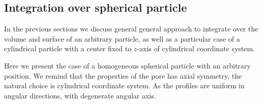 \documentclass[10pt, a4paper]{article}
\begin{document}
\subsection*{Integration over spherical particle}
\begin{multicols}{2}

In the previous sections we discuss general general approach to integrate over the volume and surface of an arbitrary particle, as well as a particular case of a cylindrical particle with a center fixed to $z$-axis of cylindrical coordinate system.

Here we present the case of a homogeneous spherical particle with an arbitrary position. 
We remind that the properties of the pore has axial symmetry, the natural choice is cylindrical coordinate system.
As the profiles are uniform in angular directions, with degenerate angular axis.  





\end{multicols}
\end{document}
